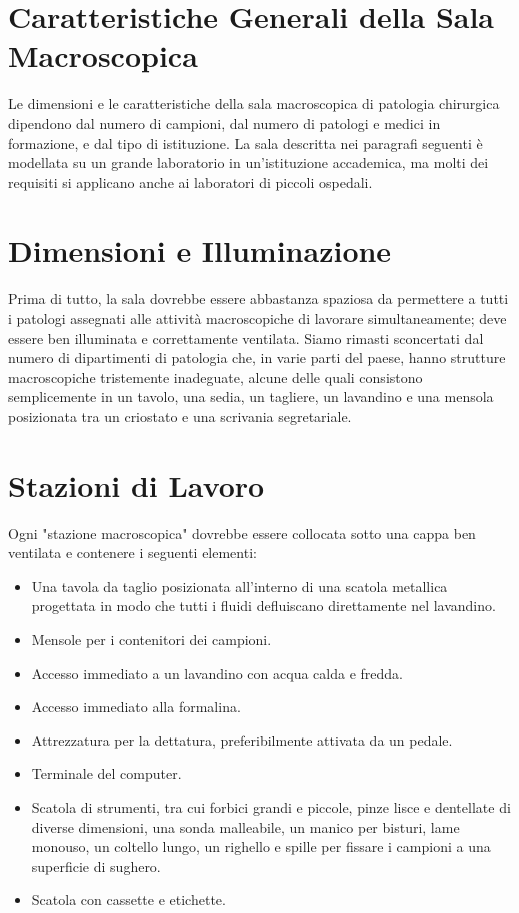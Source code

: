 \section{Caratteristiche Generali della Sala Macroscopica}
Le dimensioni e le caratteristiche della sala macroscopica di patologia chirurgica dipendono dal numero di campioni, dal numero di patologi e medici in formazione, e dal tipo di istituzione. La sala descritta nei paragrafi seguenti è modellata su un grande laboratorio in un'istituzione accademica, ma molti dei requisiti si applicano anche ai laboratori di piccoli ospedali.

\section{Dimensioni e Illuminazione}
Prima di tutto, la sala dovrebbe essere abbastanza spaziosa da permettere a tutti i patologi assegnati alle attività macroscopiche di lavorare simultaneamente; deve essere ben illuminata e correttamente ventilata. Siamo rimasti sconcertati dal numero di dipartimenti di patologia che, in varie parti del paese, hanno strutture macroscopiche tristemente inadeguate, alcune delle quali consistono semplicemente in un tavolo, una sedia, un tagliere, un lavandino e una mensola posizionata tra un criostato e una scrivania segretariale.

\section{Stazioni di Lavoro}
Ogni "stazione macroscopica" dovrebbe essere collocata sotto una cappa ben ventilata e contenere i seguenti elementi:
\begin{itemize}
    \item Una tavola da taglio posizionata all'interno di una scatola metallica progettata in modo che tutti i fluidi defluiscano direttamente nel lavandino.
    \item Mensole per i contenitori dei campioni.
    \item Accesso immediato a un lavandino con acqua calda e fredda.
    \item Accesso immediato alla formalina.
    \item Attrezzatura per la dettatura, preferibilmente attivata da un pedale.
    \item Terminale del computer.
    \item Scatola di strumenti, tra cui forbici grandi e piccole, pinze lisce e dentellate di diverse dimensioni, una sonda malleabile, un manico per bisturi, lame monouso, un coltello lungo, un righello e spille per fissare i campioni a una superficie di sughero.
    \item Scatola con cassette e etichette.
\end{itemize}

